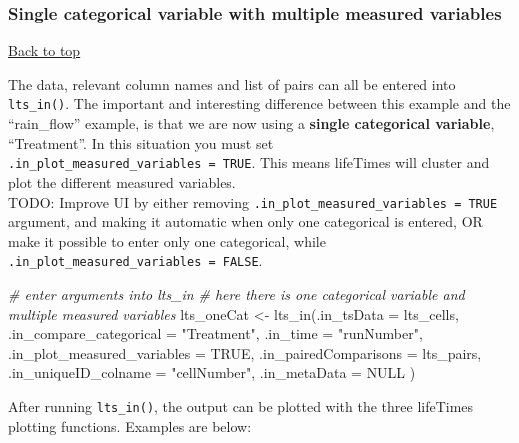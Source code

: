\documentclass[
]{article}
\newenvironment{Shaded}{\begin{snugshade}}{\end{snugshade}}
\newcommand{\AttributeTok}[1]{\textcolor[rgb]{0.77,0.63,0.00}{#1}}
\newcommand{\CommentTok}[1]{\textcolor[rgb]{0.56,0.35,0.01}{\textit{#1}}}
\newcommand{\ConstantTok}[1]{\textcolor[rgb]{0.00,0.00,0.00}{#1}}
\newcommand{\FunctionTok}[1]{\textcolor[rgb]{0.00,0.00,0.00}{#1}}
\newcommand{\NormalTok}[1]{#1}
\newcommand{\OtherTok}[1]{\textcolor[rgb]{0.56,0.35,0.01}{#1}}
\newcommand{\StringTok}[1]{\textcolor[rgb]{0.31,0.60,0.02}{#1}}
\begin{document}
\hypertarget{single-categorical-variable-with-multiple-measured-variables}{%
\subsubsection{\texorpdfstring{\textbf{Single categorical variable with
multiple measured
variables}}{Single categorical variable with multiple measured variables}}\label{single-categorical-variable-with-multiple-measured-variables}}

\protect\hyperlink{}{Back to top}

The data, relevant column names and list of pairs can all be entered
into \texttt{lts\_in()}. The important and interesting difference
between this example and the ``rain\_flow'' example, is that we are now
using a \textbf{single categorical variable}, ``Treatment''. In this
situation you must set \texttt{.in\_plot\_measured\_variables\ =\ TRUE}.
This means lifeTimes will cluster and plot the different measured
variables.\\

TODO: Improve UI by either removing
\texttt{.in\_plot\_measured\_variables\ =\ TRUE} argument, and making it
automatic when only one categorical is entered, OR make it possible to
enter only one categorical, while
\texttt{.in\_plot\_measured\_variables\ =\ FALSE}.

\begin{Shaded}
\begin{Highlighting}[]
\CommentTok{\# enter arguments into lts\_in}
\CommentTok{\# here there is one categorical variable and multiple measured variables}
\NormalTok{lts\_oneCat }\OtherTok{\textless{}{-}} \FunctionTok{lts\_in}\NormalTok{(}\AttributeTok{.in\_tsData =}\NormalTok{ lts\_cells,}
                     \AttributeTok{.in\_compare\_categorical =} \StringTok{"Treatment"}\NormalTok{,}
                     \AttributeTok{.in\_time =} \StringTok{"runNumber"}\NormalTok{,}
                     \AttributeTok{.in\_plot\_measured\_variables =} \ConstantTok{TRUE}\NormalTok{,}
                     \AttributeTok{.in\_pairedComparisons =}\NormalTok{ lts\_pairs,}
                     \AttributeTok{.in\_uniqueID\_colname =} \StringTok{"cellNumber"}\NormalTok{,}
                     \AttributeTok{.in\_metaData =} \ConstantTok{NULL}\NormalTok{ )}
\end{Highlighting}
\end{Shaded}

After running \texttt{lts\_in()}, the output can be plotted with the
three lifeTimes plotting functions. Examples are below:
\end{document}

